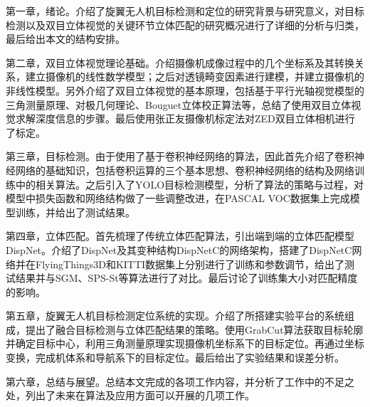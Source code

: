 第一章，绪论。介绍了旋翼无人机目标检测和定位的研究背景与研究意义，对目标检测以及双目立体视觉的关键环节立体匹配的研究概况进行了详细的分析与归类，最后给出本文的结构安排。

第二章，双目立体视觉理论基础。介绍摄像机成像过程中的几个坐标系及其转换关系，建立摄像机的线性数学模型；之后对透镜畸变因素进行建模，并建立摄像机的非线性模型。另外介绍了双目立体视觉的基本原理，包括基于平行光轴视觉模型的三角测量原理、对极几何理论、Bouguet立体校正算法等，总结了使用双目立体视觉求解深度信息的步骤。最后使用张正友摄像机标定法对ZED双目立体相机进行了标定。

第三章，目标检测。由于使用了基于卷积神经网络的算法，因此首先介绍了卷积神经网络的基础知识，包括卷积运算的三个基本思想、卷积神经网络的结构及网络训练中的相关算法。之后引入了YOLO目标检测模型，分析了算法的策略与过程，对模型中损失函数和网络结构做了一些调整改进，在PASCAL VOC数据集上完成模型训练，并给出了测试结果。

第四章，立体匹配。首先梳理了传统立体匹配算法，引出端到端的立体匹配模型DispNet。介绍了DispNet及其变种结构DispNetC的网络架构，搭建了DispNetC网络并在FlyingThings3D和KITTI数据集上分别进行了训练和参数调节，给出了测试结果并与SGM、SPS-St等算法进行了对比。最后讨论了训练集大小对匹配精度的影响。

第五章，旋翼无人机目标检测定位系统的实现。介绍了所搭建实验平台的系统组成，提出了融合目标检测与立体匹配结果的策略。使用GrabCut算法获取目标轮廓并确定目标中心，利用三角测量原理实现摄像机坐标系下的目标定位。再通过坐标变换，完成机体系和导航系下的目标定位。最后给出了实验结果和误差分析。

第六章，总结与展望。总结本文完成的各项工作内容，并分析了工作中的不足之处，列出了未来在算法及应用方面可以开展的几项工作。










